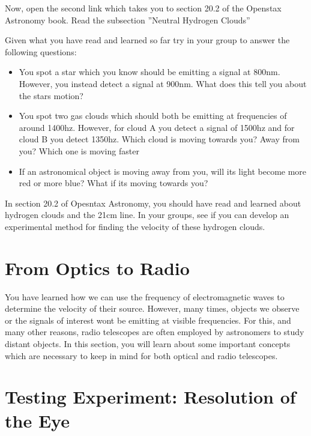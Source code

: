 \begin{steps}	
	\item Now, open the second link which takes you to section 20.2 of the Openstax Astronomy book. Read the subsection ''Neutral Hydrogen Clouds'' %
	
	\item Given what you have read and learned so far try in your group to answer the following questions:
	\begin{itemize}
		\item You spot a star which you know should be emitting a signal at 800nm. However, you instead detect a signal at 900nm. What does this tell you about the stars motion? 
		
		\item You spot two gas clouds which should both be emitting at frequencies of around 1400hz. However, for cloud A you detect a signal of 1500hz and for cloud B you detect 1350hz. Which cloud is moving towards you? Away from you? Which one is moving faster 
		
		\item If an astronomical object is moving away from you, will its light become more red or more blue? What if its moving towards you?
	\end{itemize}
	
	\item In section 20.2 of  Opesntax Astronomy, you should have read and learned about hydrogen clouds and the 21cm line. In your groups, see if you can develop an experimental method for finding the velocity of these hydrogen clouds.
\end{steps}
	
\section{From Optics to Radio}

You have learned how we can use the frequency of electromagnetic waves to determine the velocity of their source. However, many times, objects we observe or the signals of interest wont be emitting at visible frequencies. For this, and many other reasons, radio telescopes are often employed by astronomers to study distant objects. In this section, you will learn about some important concepts which are necessary to keep in mind for both optical and radio telescopes. 

\section{Testing Experiment: Resolution of the Eye}

